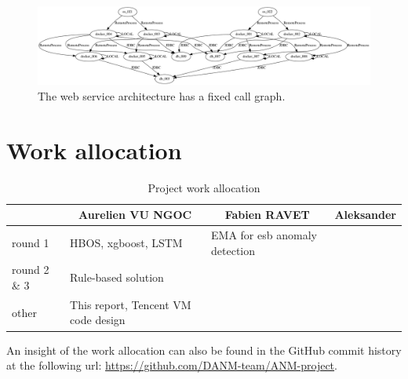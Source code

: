 \documentclass[acmsmall, screen, nonacm]{acmart}
\begin{document}
\begin{figure}[h!]
  \centering
  \includegraphics[width=\textwidth]{images/call_graph.png}
  \caption{The web service architecture has a fixed call graph.}
  \label{fig:call_graph}
\end{figure}


\newpage
\section{Work allocation}
\begin{table}[h!]
  \centering
  \begin{tabular}{|l|l|l|l|}
  \hline
               & \multicolumn{1}{c|}{Aurelien VU NGOC} & \multicolumn{1}{c|}{Fabien RAVET} & \multicolumn{1}{c|}{Aleksander} \\ \hline
  round 1      & HBOS, xgboost, LSTM                              & EMA for esb anomaly detection     &                                 \\ \hline
  round 2 \& 3 & Rule-based solution                              &                                   &                                 \\ \hline
  other        & This report, Tencent VM code design              &                                   &                                 \\ \hline
  \end{tabular}
  \caption{Project work allocation}
  \label{tab:work_allocation}
\end{table}

An insight of the work allocation can also be found in the GitHub commit history at the following url: \url{https://github.com/DANM-team/ANM-project}.
\end{document}
